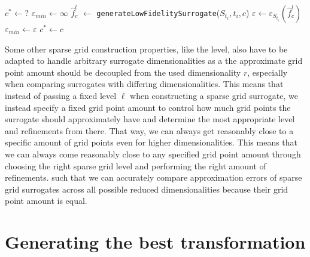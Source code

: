 \documentclass[
  a4paper,  %
  twoside,  %
  bibliography=totoc,
  headsepline,
  cleardoublepage=empty,
  parskip=half,
  draft=false
]{scrbook}
\begin{document}
\begin{mdframed}[style=algstyle,frametitle={\textbf{function} \texttt{generateBestSurrogate}{$(S_{t_i}, t_i)$}}]
\normalsize
\vspace{5.5mm}
\begin{algorithmic}[1]
    \State $c^\ast \gets ?$
    \State $\varepsilon_{min} \gets \infty$
      \State $\hat{f}_c^l$ $\gets$ \texttt{generateLowFidelitySurrogate}($S_{t_i}, t_i, c$)
    	\State $\varepsilon \gets \varepsilon_{S_{t_i}}(\hat{f}_c^l)$
    	  \State $\varepsilon_{min}\gets \varepsilon$
    	\State $c^\ast \gets c$
    	\EndIf
    \EndFor
    \State {}
\end{algorithmic}
\vspace{-1.5mm}
\delimit
	\label{alg:bestsur}
\end{mdframed}
%
Some other sparse grid construction properties, like the level, also have to be adapted to handle arbitrary surrogate dimensionalities as a the approximate grid point amount should be decoupled from the used dimensionality $r$, especially when comparing surrogates with differing dimensionalities.
This means that instead of passing a fixed level $\ell$ when constructing a sparse grid surrogate, we instead specify a fixed grid point amount to control how much grid points the surrogate should approximately have and determine the most appropriate level and refinements from there.
That way, we can always get reasonably close to a specific amount of grid points even for higher dimensionalities.
This means that we can always come reasonably close to any specified grid point amount through choosing the right sparse grid level and performing the right amount of refinements.
 such that we can accurately compare approximation errors of sparse grid surrogates across all possible reduced dimensionalities because their grid point amount is equal.


\section{Generating the best transformation}
\label{sec:trans_gen}
\end{document}
